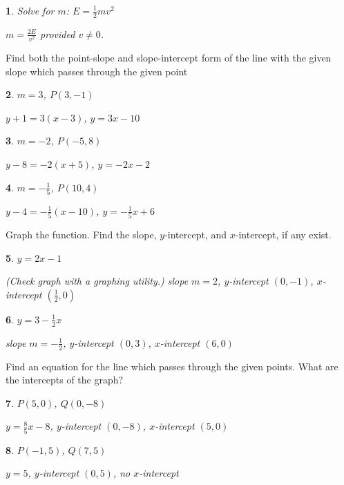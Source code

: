 \documentclass{amsbook}
\newtheorem{exc}{}
\newenvironment{ex}{\begin{exc}\normalfont}{\end{exc}}
\numberwithin{section}{chapter}
\numberwithin{equation}{chapter}
\begin{document}
\begin{ex}
	Solve for $m$: $E = \frac{1}{2}mv^2$
	\begin{sol}
		$m=\frac{2E}{v^2}$ provided $v \neq 0$.
	\end{sol}
\end{ex}

Find both the point-slope and slope-intercept form of the line with the given slope which passes through the given point
\begin{multicols}{2}
	\begin{ex}
		$m=3$, $P(3,-1)$
		\begin{sol}
			$y+1=3(x-3)$, $y=3x-10$
		\end{sol}
	\end{ex}
	\begin{ex}
	$m=-2$, $P(-5,8)$
	\begin{sol}
		$y-8=-2(x+5)$, $y=-2x-2$
	\end{sol}
\end{ex}
	\begin{ex}
	$m=-\frac{1}{5}$, $P(10,4)$
	\begin{sol}
		$y-4=-\frac{1}{5}(x-10)$, $y=-\frac{1}{5}x+6$
	\end{sol}
\end{ex}
\end{multicols}

Graph the function. Find the slope, $y$-intercept, and $x$-intercept, if any exist.
\begin{multicols}{2}
	\begin{ex}
		$y=2x-1$
		\begin{sol}
			(Check graph with a graphing utility.) slope $m=2$, $y$-intercept $(0,-1)$, $x$-intercept $\left(\frac{1}{2},0  \right)$
		\end{sol}
	\end{ex}
	\begin{ex}
	$y=3-\frac{1}{2}x$
	\begin{sol}
		slope $m=-\frac{1}{2}$, $y$-intercept $(0,3)$, $x$-intercept $\left(6,0  \right)$
	\end{sol}
\end{ex}
\end{multicols}


Find an equation for the line which passes through the given points. What are the intercepts of the graph?
\begin{multicols}{2}
	\begin{ex}
		$P(5,0)$, $Q(0,-8)$
		\begin{sol}
			$y=\frac{8}{5}x-8 $, $y$-intercept $(0,-8)$, $x$-intercept $(5,0)$
		\end{sol}
	\end{ex}
	\begin{ex}
		$P(-1,5)$, $Q(7,5)$
		\begin{sol}
			$y=5$, $y$-intercept $(0,5)$, no $x$-intercept
		\end{sol}
	\end{ex}
\end{multicols}
\end{document}
